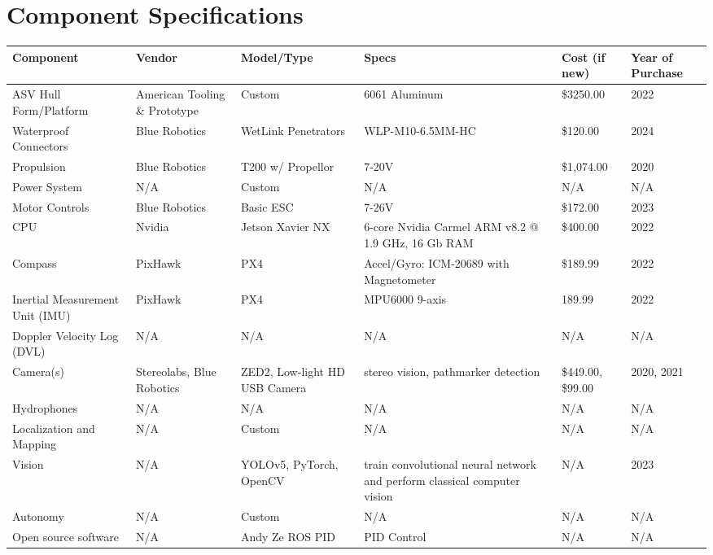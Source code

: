 \documentclass[conference]{IEEEtran}
\begin{document}
\clearpage
\section{Component Specifications}

\begin{table}[htbp]
\begin{tabularx}{\textwidth}{|X|X|X|X|X|X|}
    \hline
        Component & Vendor & Model/Type & Specs & Cost (if new) & Year of Purchase \\ \hline
        ASV Hull Form/Platform  & American Tooling \& Prototype & Custom & 6061 Aluminum & \$3250.00 & 2022 \\ \hline
        Waterproof Connectors & Blue Robotics & WetLink Penetrators & WLP-M10-6.5MM-HC & \$120.00 & 2024 \\ \hline
        Propulsion  & Blue Robotics & T200 w/ Propellor & 7-20V & \$1,074.00  & 2020\\ \hline
        Power System & N/A & Custom & N/A & N/A & N/A \\ \hline
        Motor Controls  & Blue Robotics & Basic ESC & 7-26V & \$172.00  & 2023 \\ \hline
        CPU & Nvidia & Jetson Xavier NX & 6-core Nvidia Carmel ARM v8.2 @ 1.9 GHz, 16 Gb RAM & \$400.00  & 2022 \\ \hline
        Compass  & PixHawk & PX4 & Accel/Gyro: ICM-20689 with Magnetometer & \$189.99  & 2022 \\ \hline
        Inertial Measurement Unit (IMU)  & PixHawk & PX4 & MPU6000 9-axis & 189.99 & 2022 \\ \hline
        Doppler Velocity Log (DVL) & N/A & N/A & N/A & N/A & N/A \\ \hline
        Camera(s) & Stereolabs, Blue Robotics & ZED2, Low-light HD USB Camera & stereo vision, pathmarker detection & \$449.00, \$99.00  & 2020, 2021 \\ \hline
        Hydrophones & N/A & N/A & N/A & N/A & N/A \\ \hline
        Localization and Mapping  & N/A & Custom & N/A & N/A & N/A \\ \hline
        Vision  & N/A & YOLOv5, PyTorch, OpenCV & train convolutional neural network and perform classical computer vision & N/A & 2023 \\ \hline
        Autonomy  & N/A & Custom & N/A & N/A & N/A \\ \hline
        Open source software & N/A & Andy Ze ROS PID & PID Control & N/A & N/A \\ \hline
    \end{tabularx}
\label{tab1e}
\end{table}
\end{document}
